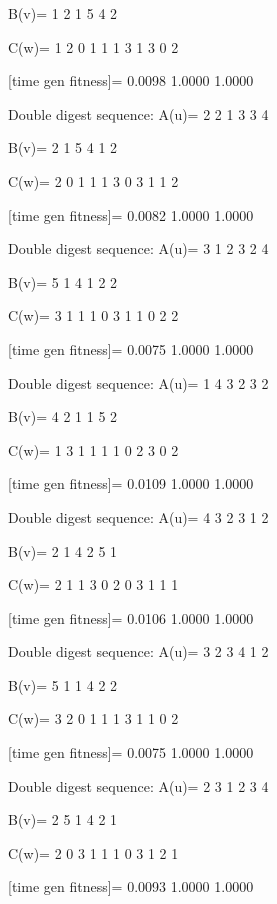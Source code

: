 B(v)=
     1     2     1     5     4     2

C(w)=
     1     2     0     1     1     1     3     1     3     0     2

[time gen fitness]=
    0.0098    1.0000    1.0000

Double digest sequence:
A(u)=
     2     2     1     3     3     4

B(v)=
     2     1     5     4     1     2

C(w)=
     2     0     1     1     1     3     0     3     1     1     2

[time gen fitness]=
    0.0082    1.0000    1.0000

Double digest sequence:
A(u)=
     3     1     2     3     2     4

B(v)=
     5     1     4     1     2     2

C(w)=
     3     1     1     1     0     3     1     1     0     2     2

[time gen fitness]=
    0.0075    1.0000    1.0000

Double digest sequence:
A(u)=
     1     4     3     2     3     2

B(v)=
     4     2     1     1     5     2

C(w)=
     1     3     1     1     1     1     0     2     3     0     2

[time gen fitness]=
    0.0109    1.0000    1.0000

Double digest sequence:
A(u)=
     4     3     2     3     1     2

B(v)=
     2     1     4     2     5     1

C(w)=
     2     1     1     3     0     2     0     3     1     1     1

[time gen fitness]=
    0.0106    1.0000    1.0000

Double digest sequence:
A(u)=
     3     2     3     4     1     2

B(v)=
     5     1     1     4     2     2

C(w)=
     3     2     0     1     1     1     3     1     1     0     2

[time gen fitness]=
    0.0075    1.0000    1.0000

Double digest sequence:
A(u)=
     2     3     1     2     3     4

B(v)=
     2     5     1     4     2     1

C(w)=
     2     0     3     1     1     1     0     3     1     2     1

[time gen fitness]=
    0.0093    1.0000    1.0000

